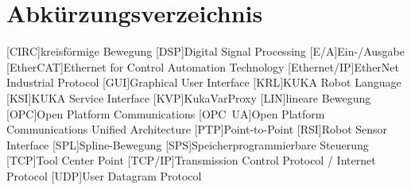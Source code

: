\section*{Abkürzungsverzeichnis}


\begin{acronym}
    [CIRC]{kreisförmige Bewegung}
    [DSP]{Digital Signal Processing}
    [E/A]{Ein-/Ausgabe}
    [EtherCAT]{Ethernet for Control Automation Technology}
    [Ethernet/IP]{EtherNet Industrial Protocol}
    [GUI]{Graphical User Interface}
    [KRL]{KUKA Robot Language}
    [KSI]{KUKA Service Interface}
    [KVP]{KukaVarProxy}
    [LIN]{lineare Bewegung}
    [OPC]{Open Platform Communications}
    [OPC~UA]{Open Platform Communications Unified Architecture}
    [PTP]{Point-to-Point}
    [RSI]{Robot Sensor Interface}
    [SPL]{Spline-Bewegung}
    [SPS]{Speicherprogrammierbare Steuerung}
    [TCP]{Tool Center Point}
    [TCP/IP]{Transmission Control Protocol / Internet Protocol}
    [UDP]{User Datagram Protocol}
\end{acronym}
